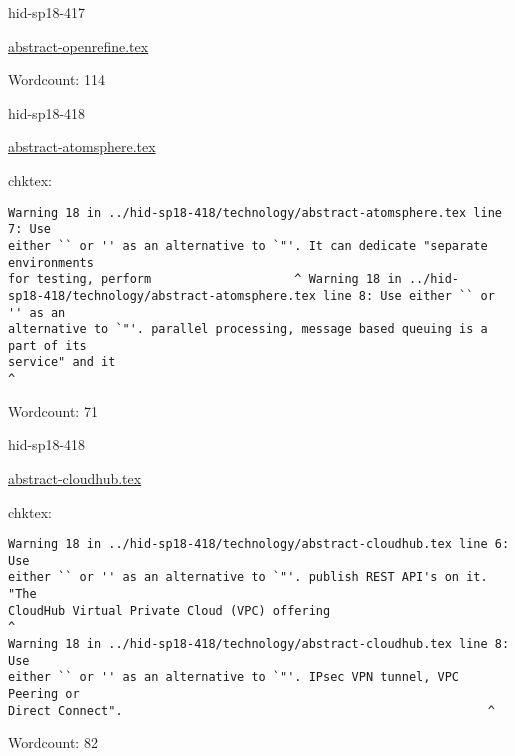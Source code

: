 

\begin{IU}

hid-sp18-417

\href{https://github.com/cloudmesh-community/hid-sp18-417/blob/master//technology/abstract-openrefine.tex}{abstract-openrefine.tex}

 

Wordcount: 114

\end{IU}



\begin{IU}

hid-sp18-418

\href{https://github.com/cloudmesh-community/hid-sp18-418/blob/master//technology/abstract-atomsphere.tex}{abstract-atomsphere.tex}

 
chktex:
\begin{tiny}
\begin{verbatim}
Warning 18 in ../hid-sp18-418/technology/abstract-atomsphere.tex line 7: Use
either `` or '' as an alternative to `"'. It can dedicate "separate environments
for testing, perform                    ^ Warning 18 in ../hid-
sp18-418/technology/abstract-atomsphere.tex line 8: Use either `` or '' as an
alternative to `"'. parallel processing, message based queuing is a part of its
service" and it
^
\end{verbatim}
\end{tiny}

Wordcount: 71

\end{IU}



\begin{IU}

hid-sp18-418

\href{https://github.com/cloudmesh-community/hid-sp18-418/blob/master//technology/abstract-cloudhub.tex}{abstract-cloudhub.tex}

 
chktex:
\begin{tiny}
\begin{verbatim}
Warning 18 in ../hid-sp18-418/technology/abstract-cloudhub.tex line 6: Use
either `` or '' as an alternative to `"'. publish REST API's on it. "The
CloudHub Virtual Private Cloud (VPC) offering                              ^
Warning 18 in ../hid-sp18-418/technology/abstract-cloudhub.tex line 8: Use
either `` or '' as an alternative to `"'. IPsec VPN tunnel, VPC Peering or
Direct Connect".                                                   ^
\end{verbatim}
\end{tiny}

Wordcount: 82

\end{IU}

